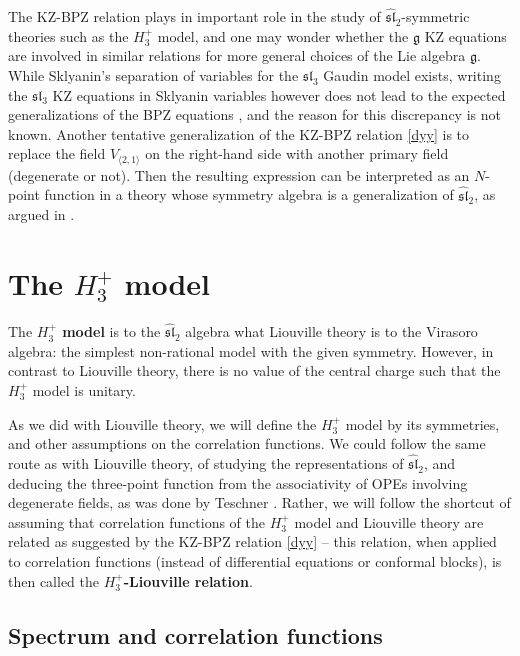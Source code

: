 \documentclass[12pt,a4paper,notitlepage]{report}
\numberwithin{equation}{section}
\theoremstyle{break}
\begin{document}
The KZ-BPZ relation plays in important role in the study of $\widehat{\mathfrak{sl}}_2$-symmetric theories such as the $H_3^+$ model, and one may wonder whether the $\mathfrak{g}$ KZ equations are involved in similar relations for more general choices of the Lie algebra $\mathfrak{g}$.
While Sklyanin's separation of variables for the $\mathfrak{sl}_3$ Gaudin model exists, writing the $\mathfrak{sl}_3$ KZ equations in Sklyanin variables however does not lead to the expected generalizations of the BPZ equations \cite{rib08b}, and the reason for this discrepancy is not known. 
Another tentative generalization of the KZ-BPZ relation \eqref{dyy} is to replace the field $V_{\langle 2,1\rangle}$ on the right-hand side with another primary field (degenerate or not).
Then the resulting expression can be interpreted as an $N$-point function in a theory whose symmetry algebra is a generalization of $\widehat{\mathfrak{sl}}_2$, as argued in \cite{rib08}.


\section{The \texorpdfstring{$H_3^+$}{H3+} model \label{sechtp}}

The \textbf{\boldmath $H_3^+$ model} is to the $\widehat{\mathfrak{sl}}_2$ algebra what Liouville theory is to the Virasoro algebra: the simplest non-rational model with the given symmetry.
However, in contrast to Liouville theory, there is no value of the central charge such that the $H_3^+$ model is unitary. 

As we did with Liouville theory, we will define the $H_3^+$ model by its symmetries, and other assumptions on the correlation functions.
We could follow the same route as with Liouville theory, of studying the representations of $\widehat{\mathfrak{sl}}_2$, and deducing the three-point function from the associativity of OPEs involving degenerate fields, as was done by Teschner \cite{tes97a}.
Rather, we will follow the shortcut of assuming that correlation functions of the $H_3^+$ model and Liouville theory are related as suggested by the KZ-BPZ relation \eqref{dyy} -- this relation, when applied to correlation functions (instead of differential equations or conformal blocks), is then called the \textbf{\boldmath $H_3^+$-Liouville relation}.


\subsection{Spectrum and correlation functions}
\end{document}
